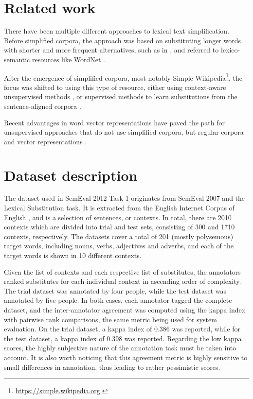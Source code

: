 \documentclass[10pt, a4paper]{article}
\begin{document}
\section{Related work}

There have been multiple different approaches to lexical text simplification. Before simplified corpora, the approach was based on substituting longer words with shorter and more frequent alternatives, such as in \citep{carroll1998practical,de2010text}, and referred to lexico-semantic resources like WordNet \citep{fellbaum1998wordnet}.

After the emergence of simplified corpora, most notably Simple Wikipedia\footnote{\url{https://simple.wikipedia.org}.}, the focus was shifted to using this type of resource, either using context-aware unsupervised methods \citep{biran2011putting}, or supervised methods to learn substitutions from the sentence-aligned corpora \citep{horn2014learning}.

Recent advantages in word vector representations \citep{pennington2014glove} have paved the path for unsupervised approaches that do not use simplified corpora, but regular corpora and vector representations \citep{glavavs2015simplifying}.

\section{Dataset description}

The dataset used in SemEval-2012 Task 1 originates from SemEval-2007 and the Lexical Substitution task. It is extracted from the English Internet Corpus of English \citep{sharoff2006creating}, and is a selection of sentences, or contexts. In total, there are 2010 contexts which are divided into trial and test sets, consisting of 300 and 1710 contexts, respectively. The datasets cover a total of 201 (mostly polysemous) target words, including nouns, verbs, adjectives and adverbs, and each of the target words is shown in 10 different contexts.

Given the list of contexts and each respective list of substitutes, the annotators ranked substitutes for each individual context in ascending order of complexity. The trial dataset was annotated by four people, while the test dataset was annotated by five people. In both cases, each annotator tagged the complete dataset, and the inter-annotator agreement was computed using the kappa index with pairwise rank comparisons, the same metric being used for system evaluation. On the trial dataset, a kappa index of 0.386 was reported, while for the test dataset, a kappa index of 0.398 was reported. Regarding the low kappa scores, the highly subjective nature of the annotation task must be taken into account. It is also worth noticing that this agreement metric is highly sensitive to small differences in annotation, thus leading to rather pessimistic scores.
\end{document}
